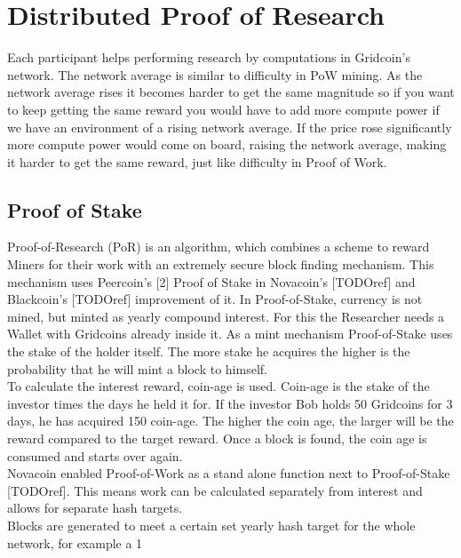 \section{Distributed Proof of Research}

Each participant helps performing research by computations in Gridcoin's network. The network average is similar to difficulty in PoW mining. As the network average rises it becomes harder to get the same magnitude so if you want to keep getting the same reward you would have to add more compute power if we have an environment of a rising network average. If the price rose significantly more compute power would come on board, raising the network average, making it harder to get the same reward, just like difficulty in Proof of Work.

\subsection{Proof of Stake}

Proof-of-Research (PoR) is an algorithm, which combines a scheme to reward Miners for their work with an extremely secure block finding mechanism. This mechanism uses Peercoin's [2] Proof of Stake in Novacoin's [TODOref] and Blackcoin's [TODOref] improvement of it. In Proof-of-Stake, currency is not mined, but minted as yearly compound interest. For this the Researcher needs a Wallet with Gridcoins already inside it. As a mint mechanism Proof-of-Stake uses the stake of the holder itself. The more stake he acquires the higher is the probability that he will mint a block to himself.\\

To calculate the interest reward, coin-age is used. Coin-age is the stake of the investor times the days he held it for. If the investor Bob holds 50 Gridcoins for 3 days, he has acquired 150 coin-age. The higher the coin age, the larger will be the reward compared to the target reward. Once a block is found, the coin age is consumed and starts over again.\\

Novacoin enabled Proof-of-Work as a stand alone function next to Proof-of-Stake [TODOref]. This means work can be calculated separately from interest and allows for separate hash targets.\\

Blocks are generated to meet a certain set yearly hash target for the whole network, for example a 1%

